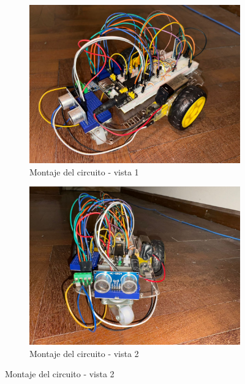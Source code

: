\documentclass[]{article}
\begin{document}
	\begin{figure}[h!]
		\centering
		\begin{subfigure}[b]{0.45\textwidth}
			\centering
			\includegraphics[width=\linewidth]{Figuras/montaje_1}
			\caption{Montaje del circuito - vista 1}
			\label{fig:montaje1}
		\end{subfigure}
		\hfill
		\begin{subfigure}[b]{0.45\textwidth}
			\centering
			\includegraphics[width=\linewidth]{Figuras/montaje_2}
			\caption{Montaje del circuito - vista 2}
			\label{fig:montaje2}
		\end{subfigure}
		
		\vspace{0.5cm}
		

\end{figure}
\end{document}
